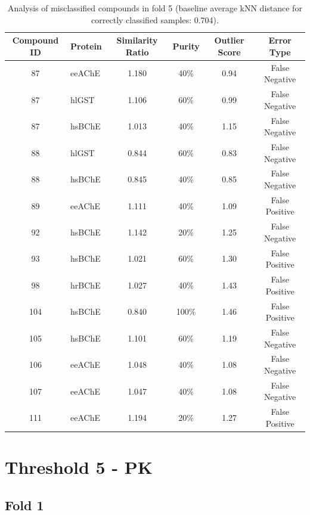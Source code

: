 \documentclass{article}
\newenvironment{smarttabular}[1]{%
    \begin{tabular}{#1}%
}{%
    \end{tabular}%
}
\begin{document}
\begin{table}[H]
    \centering
    \small
    \caption{Analysis of misclassified compounds in fold 5 (baseline average kNN distance for correctly classified samples: 0.704).}
    \label{tab:misclassified_compounds_5}
    \begin{smarttabular}{clcccc}
        \toprule
        \textbf{Compound ID} & \textbf{Protein} & \textbf{Similarity Ratio} & \textbf{Purity} & \textbf{Outlier Score} & \textbf{Error Type} \\
        \midrule
        87 & eeAChE & 1.180 & 40\% & 0.94 & False Negative \\
        87 & hlGST & 1.106 & 60\% & 0.99 & False Negative \\
        87 & hsBChE & 1.013 & 40\% & 1.15 & False Negative \\
        88 & hlGST & 0.844 & 60\% & 0.83 & False Negative \\
        88 & hsBChE & 0.845 & 40\% & 0.85 & False Negative \\
        89 & eeAChE & 1.111 & 40\% & 1.09 & False Positive \\
        92 & hsBChE & 1.142 & 20\% & 1.25 & False Negative \\
        93 & hsBChE & 1.021 & 60\% & 1.30 & False Positive \\
        98 & hrBChE & 1.027 & 40\% & 1.43 & False Positive \\
        104 & hsBChE & 0.840 & 100\% & 1.46 & False Positive \\
        105 & hsBChE & 1.101 & 60\% & 1.19 & False Negative \\
        106 & eeAChE & 1.048 & 40\% & 1.08 & False Negative \\
        107 & eeAChE & 1.047 & 40\% & 1.08 & False Negative \\
        111 & eeAChE & 1.194 & 20\% & 1.27 & False Positive \\
        \bottomrule
    \end{smarttabular}
\end{table}

\clearpage

\section{Threshold 5 - PK}

\subsection{Fold 1}
\end{document}
